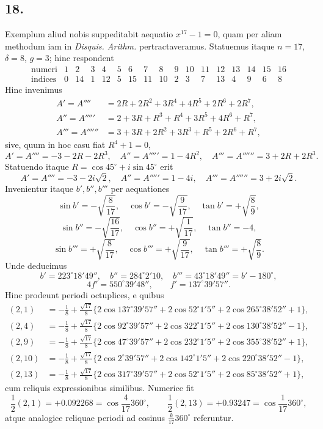 \documentclass[12pt]{article}
\begin{document}
\subsection*{18.}

Exemplum aliud nobis suppeditabit aequatio $x^{17}-1=0$, quam per aliam methodum iam in \emph{Disquis. Arithm.} pertractaveramus. Statuemus itaque $n=17$, $\delta=8$, $g=3$; hinc respondent
\[
\begin{array}{c|cccccccccccccccc}
\text{numeri}&1&2&3&4&5&6&7&8&9&10&11&12&13&14&15&16\\
\text{indices}&0&14&1&12&5&15&11&10&2&3&7&13&4&9&6&8
\end{array}
\]
Hinc invenimus
\[
\begin{aligned}
A'=A''''&=2R+2R^2+3R^4+4R^5+2R^6+2R^7,\\
A''=A'''''&=2+3R+R^3+R^4+3R^5+4R^6+R^7,\\
A'''=A''''''&=3+3R+2R^2+3R^3+R^5+2R^6+R^7,
\end{aligned}
\]
sive, quum in hoc casu fiat $R^4+1=0$,
\[
A'=A''''=-3-2R-2R^3,\quad
A''=A'''''=1-4R^2,\quad
A'''=A''''''=3+2R+2R^3.
\]
Statuendo itaque $R=\cos45^\circ+i\sin45^\circ$ erit
\[
A'=A''''=-3-2i\sqrt2,\quad A''=A'''''=1-4i,\quad A'''=A''''''=3+2i\sqrt2.
\]
Invenientur itaque $b',b'',b'''$ per aequationes
\[
\sin b'=-\sqrt{\frac8{17}},\quad \cos b'=-\sqrt{\frac9{17}},\quad \tan b'=+\sqrt{\frac89},
\]
\[
\sin b''=-\sqrt{\frac{16}{17}},\quad \cos b''=+\sqrt{\frac1{17}},\quad \tan b''=-4,
\]
\[
\sin b'''=+\sqrt{\frac8{17}},\quad \cos b'''=+\sqrt{\frac9{17}},\quad \tan b'''=+\sqrt{\frac89}.
\]
Unde deducimus
\[
b'=223^\circ18'49'',\quad b''=284^\circ2'10,\quad b'''=43^\circ18'49''=b'-180^\circ,
\]
\[
4f'=550^\circ39'48'',\qquad f'=137^\circ39'57''.
\]
Hinc prodeunt periodi octuplices, e quibus
\[
\begin{aligned}
(2,1)&=-\frac18+\frac{\sqrt{17}}8\{2\cos137^\circ39'57''+2\cos52^\circ1'5''+2\cos265^\circ38'52''+1\},\\
(2,4)&=-\frac18+\frac{\sqrt{17}}8\{2\cos92^\circ39'57''+2\cos322^\circ1'5''+2\cos130^\circ38'52''-1\},\\
(2,9)&=-\frac18+\frac{\sqrt{17}}8\{2\cos47^\circ39'57''+2\cos232^\circ1'5''+2\cos355^\circ38'52''+1\},\\
(2,10)&=-\frac18+\frac{\sqrt{17}}8\{2\cos2^\circ39'57''+2\cos142^\circ1'5''+2\cos220^\circ38'52''-1\},\\
(2,13)&=-\frac18+\frac{\sqrt{17}}8\{2\cos317^\circ39'57''+2\cos52^\circ1'5''+2\cos85^\circ38'52''+1\},
\end{aligned}
\]
cum reliquis expressionibus similibus. Numerice fit
\[
\frac12(2,1)=+0.092268=\cos\frac{4}{17}360^\circ,\qquad
\frac12(2,13)=+0.93247=\cos\frac{1}{17}360^\circ,
\]
atque analogice reliquae periodi ad cosinus $\frac{k}{17}360^\circ$ referuntur.
\end{document}

